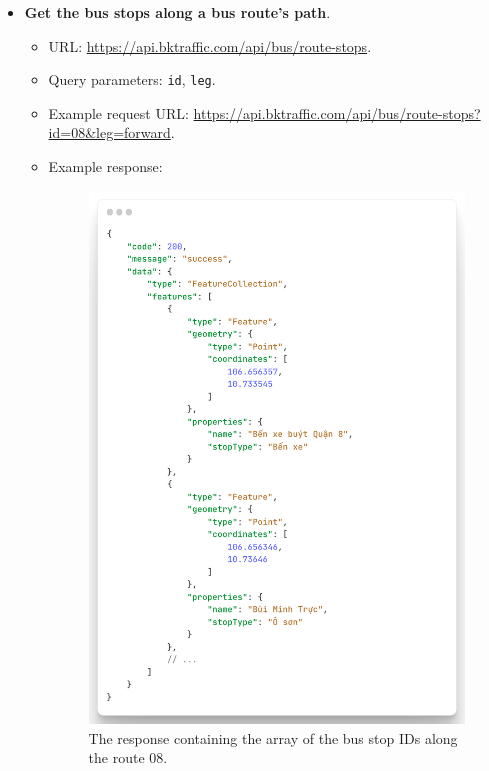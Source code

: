 \begin{itemize}
    \item \textbf{Get the bus stops along a bus route's path}.
    \begin{itemize}
        \item URL: \url{https://api.bktraffic.com/api/bus/route-stops}.
        \item Query parameters: \lstinline{id}, \lstinline{leg}.
        \item Example request URL: \url{https://api.bktraffic.com/api/bus/route-stops?id=08&leg=forward}.
        \item Example response:
        \begin{figure}[H]
            \includegraphics[width=\textwidth]{assets/images/Implementation/route_stops_response.png}
            \caption{The response containing the array of the bus stop IDs along the route 08.}
            \label{fig:route_stops_response}
        \end{figure}
    \end{itemize}


\end{itemize}
